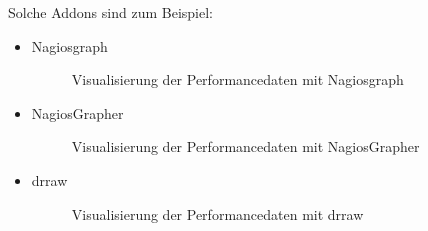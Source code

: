 Solche Addons sind zum Beispiel:
\begin{itemize}
\item Nagiosgraph 

\begin{figure}[ht]
	\centering
		\caption{Visualisierung der Performancedaten mit Nagiosgraph}
		\label{nagiosgraph}
\end{figure}

\item NagiosGrapher

\begin{figure}[ht]
	\centering
		\caption{Visualisierung der Performancedaten mit NagiosGrapher}
		\label{nagios}
\end{figure}
\newpage
\item drraw

\begin{figure}[ht]
	\centering
		\caption{Visualisierung der Performancedaten mit drraw}
		\label{drraw}
\end{figure}


\end{itemize}

